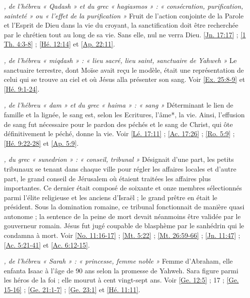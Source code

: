 \begin{multicols}{2}
\textit{, de l'hébreu « Qadash » et du grec « hagiasmos » : « consécration, purification, sainteté » ou « l'effet de la purification »}\newline
Fruit de l'action conjointe de la Parole et l'Esprit de Dieu dans la vie du croyant, la sanctification doit être recherchée par le chrétien tout au long de sa vie. Sans elle, nul ne verra Dieu. \vref{Jn. 17:17} ; \vref{1 Th. 4:3-8} ; \vref{Hé. 12:14} et \vref{Ap. 22:11}.

\textit{, de l'hébreu « miqdash » : « lieu sacré, lieu saint, sanctuaire de Yahweh »}\newline
Le sanctuaire terrestre, dont Moïse avait reçu le modèle, était une représentation de celui qui se trouve au ciel et où Jésus alla présenter son sang. Voir \vref{Ex. 25:8-9} et \vref{Hé. 9:1-24}.

\textit{, de l'hébreu « dam » et du grec « haima » : « sang »}\newline
Déterminant le lien de famille et la lignée, le sang est, selon les Ecritures, l'âme*, la vie. Ainsi, l'effusion de sang fut nécessaire pour le pardon des péchés et le sang de Christ, qui ôte définitivement le péché, donne la vie. Voir \vref{Lé. 17:11} ; \vref{Ac. 17:26} ; \vref{Ro. 5:9} ; \vref{Hé. 9:22-28} et \vref{Ap. 5:9}.

\textit{, du grec « sunedrion » : « conseil, tribunal »}\newline
Désignait d'une part, les petits tribunaux se tenant dans chaque ville pour régler les affaires locales et d'autre part, le grand conseil de Jérusalem où étaient traitées les affaires plus importantes. Ce dernier était composé de soixante et onze membres sélectionnés parmi l'élite religieuse et les anciens d'Israël ; le grand prêtre en était le président. Sous la domination romaine, ce tribunal fonctionnait de manière quasi autonome ; la sentence de la peine de mort devait néanmoins être validée par le gouverneur romain. Jésus fut jugé coupable de blasphème par le sanhédrin qui le condamna à mort. Voir \vref{No. 11:16-17} ; \vref{Mt. 5:22} ; \vref{Mt. 26:59-66} ; \vref{Jn. 11:47} ; \vref{Ac. 5:21-41} et \vref{Ac. 6:12-15}.

\textit{, de l'hébreu « Sarah » : « princesse, femme noble »}\newline
Femme d'Abraham, elle enfanta Isaac à l'âge de 90 ans selon la promesse de Yahweh. Sara figure parmi les héros de la foi ; elle mourut à cent vingt-sept ans. Voir \vref{Ge. 12:5} ; 17 ; \vref{Ge. 15-16} ; \vref{Ge. 21:1-7} ; \vref{Ge. 23:1} et \vref{Hé. 11:11}.


\end{multicols}

